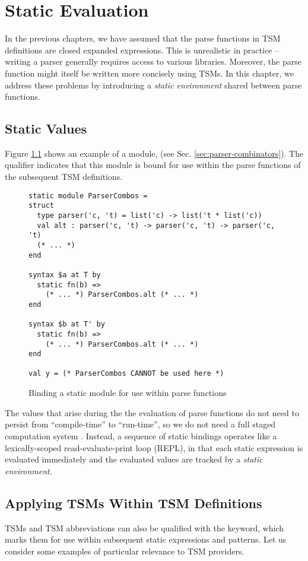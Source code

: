 \ificfp \else  
\chapter{Static Evaluation}\label{chap:static-eval}
In the previous chapters, we have assumed that the parse functions in TSM definitions are closed expanded expressions. This is unrealistic in practice -- writing a parser generally requires access to various libraries. Moreover, the parse function might itself be written more concisely using TSMs. In this chapter, we address these problems by introducing a \emph{static environment} shared between parse functions.

\section{Static Values}
Figure \ref{fig:static-module-example} shows an example of a module,  (see Sec. \ref{sec:parser-combinators}). The  qualifier indicates that this module is bound for use within the parse functions of the subsequent TSM definitions.
\begin{figure}[h]
\begin{lstlisting}
static module ParserCombos = 
struct 
  type parser('c, 't) = list('c) -> list('t * list('c))
  val alt : parser('c, 't) -> parser('c, 't) -> parser('c, 't)
  (* ... *)
end

syntax $a at T by 
  static fn(b) => 
  	(* ... *) ParserCombos.alt (* ... *)
end

syntax $b at T' by 
  static fn(b) => 
    (* ... *) ParserCombos.alt (* ... *)
end

val y = (* ParserCombos CANNOT be used here *)
\end{lstlisting}
\caption{Binding a static module for use within parse functions}
\label{fig:static-module-example}
\end{figure}
\clearpage

The values that arise during the the evaluation of parse functions do not need to persist from ``compile-time'' to ``run-time'', so we do not need a full staged computation system \cite{Taha99multi-stageprogramming:}. Instead, a sequence of static bindings operates like a lexically-scoped read-evaluate-print loop (REPL), in that each static expression is evaluated immediately and the evaluated values are tracked by a \emph{static environment}.


\section{Applying TSMs Within TSM Definitions}\label{sec:tsms-for-tsms}
TSMs and TSM abbreviations can also be qualified with the  keyword, which marks them for use within subsequent static expressions and patterns. Let us consider some examples of particular relevance to TSM providers.

